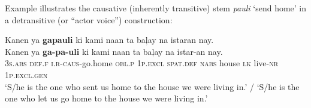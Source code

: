 Example  illustrates the causative (inherently transitive) stem \textit{pauli} ‘send home’ in a detransitive (or “actor voice”) construction:

\ea
\label{bkm:Ref122944930}
Kanen  ya  \textbf{gapauli}  ki  kami  naan  ta  baļay na  istaran  nay. \\\smallskip
\gll Kanen  ya  \textbf{ga-pa-uli}\footnotemark{}  ki  kami  naan  ta baļay na  istar-an  nay. \\
3\textsc{s.abs}  \textsc{def.f}  \textsc{i.r}-\textsc{caus}-go.home  \textsc{obl.p}  1\textsc{p.excl}  \textsc{spat.def}  \textsc{nabs}  house
\textsc{lk}  live-\textsc{nr} 1\textsc{p.excl.gen} \\
\glt `S/he is the one who sent us home to the house we were living in.' / ‘S/he is the one who let us go home to the house we were living in.’
\z

